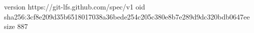 version https://git-lfs.github.com/spec/v1
oid sha256:3cf8e209d35b6518017038a36bede254c205c380e8b7e289d9dc320bdb0647ee
size 887
